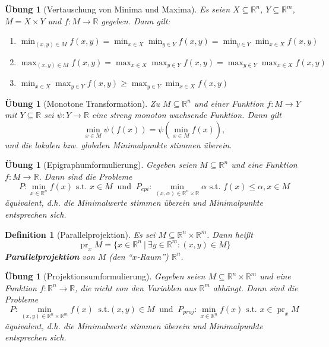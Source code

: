 \documentclass[11pt]{scrreprt}
\newcounter{thm}
\numberwithin{thm}{section}
\newtheorem{definition}[thm]{Definition}
\newtheorem{uebung}[thm]{Übung}
\begin{document}
\begin{uebung}[Vertauschung von Minima und Maxima]
	Es seien $X \subseteq \mathbb{R}^n$, $Y \subseteq \mathbb{R}^m$, $M = X \times Y$ und $f \colon M \rightarrow \mathbb{R}$ gegeben. Dann gilt:
	\begin{enumerate}[label=\alph*\upshape)]
		\item $\min_{(x,y) \in M} f(x, y) = \min_{x \in X} \min_{y \in Y} f(x,y) = \min_{y \in Y} \min_{x \in X} f(x, y)$
		\item $\max_{(x,y) \in M} f(x, y) = \max_{x \in X} \max_{y \in Y} f(x,y) = \max_{y \in Y} \max_{x \in X} f(x, y)$
		\item $\min_{x \in X} \max_{y \in Y} f(x, y) \geq \max_{y \in Y} \min_{x \in X} f(x, y)$
	\end{enumerate}
\end{uebung}

\begin{uebung}[Monotone Transformation]
	Zu $M \subseteq \mathbb{R}^n$ und einer Funktion $f \colon M \rightarrow Y$ mit $Y\subseteq \mathbb{R}$ sei $\psi \colon Y \rightarrow \mathbb{R}$ eine streng monoton wachsende Funktion. Dann gilt
	$$ \min_{x \in M} \psi \left( f(x) \right) = \psi \left( \min_{x \in M} f(x) \right), $$
	und die lokalen bzw. globalen Minimalpunkte stimmen überein.
\end{uebung}

\begin{uebung}[Epigraphumformulierung]
	Gegeben seien $M \subseteq \mathbb{R}^n$ und eine Funktion $f \colon M \rightarrow \mathbb{R}$. Dann sind die Probleme
	$$ P \colon \min_{x \in \mathbb{R}^n} f(x) \text{ s.t. } x \in M ~\text{ und } ~ P_{epi} \colon \min_{(x, \alpha) \in \mathbb{R}^n \times \mathbb{R}} \alpha \text{ s.t. } f(x) \leq \alpha, x \in M $$
	äquivalent, d.h. die Minimalwerte stimmen überein und Minimalpunkte entsprechen sich.
\end{uebung}

\begin{definition}[Parallelprojektion]
	Es sei $M \subseteq \mathbb{R}^n \times \mathbb{R}^m$. Dann heißt
	$$ \operatorname{pr}_x M = \big\{ x \in \mathbb{R}^n ~|~\exists y \in \mathbb{R}^m : (x, y) \in M \big\} $$
	\textbf{Parallelprojektion} von $M$ (den \enquote{$x$-Raum}) $\mathbb{R}^n$.
\end{definition}

\begin{uebung}[Projektionsumformulierung]
	Gegeben seien $M \subseteq \mathbb{R}^n \times \mathbb{R}^m$ und eine Funktion $f \colon \mathbb{R}^n \rightarrow \mathbb{R}$, die nicht von den Variablen aus $\mathbb{R}^m$ abhängt. Dann sind die Probleme 
	$$ P \colon \min_{(x, y) \in \mathbb{R}^n \times \mathbb{R}^m} f(x) ~\text{ s.t.} (x, y) \in M ~\text{ und } ~ P_{proj} \colon \min_{x \in \mathbb{R}^n} f(x) \text{ s.t. } x \in \operatorname{pr}_x M $$
	äquivalent, d.h. die Minimalwerte stimmen überein und Minimalpunkte entsprechen sich.
\end{uebung}
\end{document}
